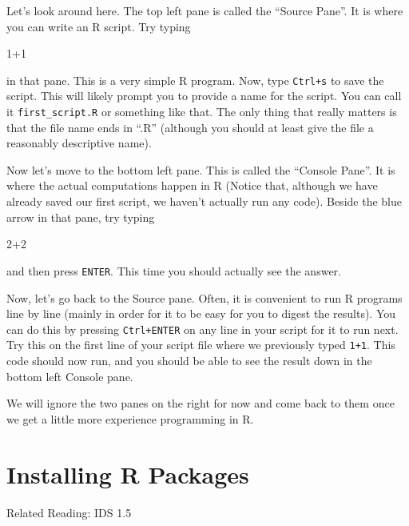 \documentclass[
  letterpaper,
  DIV=11,
  numbers=noendperiod]{scrreprt}
\newenvironment{Shaded}{\begin{snugshade}}{\end{snugshade}}
\newcommand{\DecValTok}[1]{\textcolor[rgb]{0.68,0.00,0.00}{#1}}
\newcommand{\SpecialCharTok}[1]{\textcolor[rgb]{0.37,0.37,0.37}{#1}}
\begin{document}
Let's look around here. The top left pane is called the ``Source Pane''.
It is where you can write an R script. Try typing

\begin{Shaded}
\begin{Highlighting}[]
\DecValTok{1}\SpecialCharTok{+}\DecValTok{1}
\end{Highlighting}
\end{Shaded}

in that pane. This is a very simple R program. Now, type \texttt{Ctrl+s}
to save the script. This will likely prompt you to provide a name for
the script. You can call it \texttt{first\_script.R} or something like
that. The only thing that really matters is that the file name ends in
``.R'' (although you should at least give the file a reasonably
descriptive name).

Now let's move to the bottom left pane. This is called the ``Console
Pane''. It is where the actual computations happen in R (Notice that,
although we have already saved our first script, we haven't actually run
any code). Beside the blue arrow in that pane, try typing

\begin{Shaded}
\begin{Highlighting}[]
\DecValTok{2}\SpecialCharTok{+}\DecValTok{2}
\end{Highlighting}
\end{Shaded}

and then press \texttt{ENTER}. This time you should actually see the
answer.

Now, let's go back to the Source pane. Often, it is convenient to run R
programs line by line (mainly in order for it to be easy for you to
digest the results). You can do this by pressing \texttt{Ctrl+ENTER} on
any line in your script for it to run next. Try this on the first line
of your script file where we previously typed \texttt{1+1}. This code
should now run, and you should be able to see the result down in the
bottom left Console pane.

We will ignore the two panes on the right for now and come back to them
once we get a little more experience programming in R.

\section{Installing R Packages}\label{installing-r-packages}

Related Reading: IDS 1.5
\end{document}
